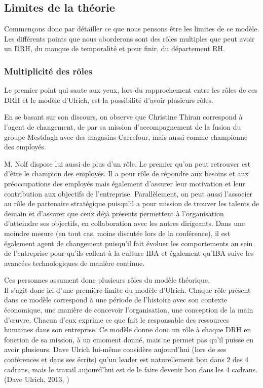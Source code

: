 \subsection{Limites de la théorie}

Commençons donc par détailler ce que nous pensons être les limites de ce modèle. Les différents points que nous aborderons sont des rôles multiples que peut avoir un DRH, du manque de temporalité et pour finir, du département RH.\newline

\subsubsection*{Multiplicité des rôles} 

Le premier point qui saute aux yeux, lors du rapprochement entre les rôles de ces DRH et le modèle d'Ulrich, est la possibilité d'avoir plusieurs rôles. \newline

En se basant sur son discours, on observe que Christine Thiran correspond à l'\og{}agent de changement\fg{}, de par sa mission d'accompagnement de la fusion du groupe Mestdagh avec des magasins Carrefour, mais aussi comme \og{}championne des employés\fg{}. \newline

M. Nolf dispose lui aussi de plus d'un rôle. Le premier qu'on peut retrouver est d'être le \og{}champion des employés\fg{}. Il a pour rôle de répondre aux besoins et aux préoccupations des employés mais également d'assurer leur motivation et leur contribution aux objectifs de l'entreprise. Parallèlement, on peut aussi l'associer au rôle de \og{}partenaire stratégique \fg{} puisqu'il a pour mission de trouver les talents de demain et d'assurer que ceux déjà présents permettent à l'organisation d'atteindre ses objectifs, en collaboration avec les autres dirigeants. Dans une moindre mesure (en tout cas, moins discutée lors de la conférence), il est également \og{}agent de changement\fg{} puisqu'il fait évoluer les comportements au sein de l'entreprise pour qu'ils collent à la culture IBA et également qu'IBA suive les avancées technologiques de manière continue. 

Ces personnes assument donc plusieurs rôles du modèle théorique. \\

Il s'agit donc ici d'une première limite du modèle d'Ulrich. Chaque rôle présent dans ce modèle correspond à une période de l'histoire avec son contexte économique, une manière de concevoir l'organisation, une conception de la main d'\oe{}uvre. Chacun d'eux exprime ce que fait le responsable des ressources humaines dans son entreprise. Ce modèle donne donc un rôle à chaque DRH en fonction de sa mission, à un cmoment donné, mais ne permet pas qu'il puisse en avoir plusieurs. Dave Ulrich lui-même considère aujourd'hui (lors de ses conférences et dans ses écrits) qu'un leader est naturellement bon dans 2 des 4 cadrans, mais le travail aujourd'hui est de le faire devenir bon dans les 4 cadrans. (Dave Ulrich, 2013, \cite{leadership2013})\newline 

